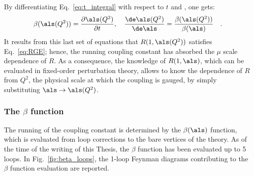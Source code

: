 By differentiating Eq.~\ref{eq:t_integral} with respect to $t$ and \als, one gets:
\begin{equation}\label{eq:beta_def}
    \beta(\als(Q^2)) = \frac{\partial\als(Q^2)}{\partial t}, \quad \frac{\de\als(Q^2)}{\de\als} = \frac{\beta(\als (Q^2))}{\beta(\als)}\quad .
\end{equation}
It results from this last set of equations that $R(1,\als(Q^2))$ satisfies Eq.~\ref{eq:RGE}; hence, the running coupling constant has absorbed the $\mu$ scale dependence of $R$. As a consequence, the knowledge of $R(1,\als)$, which can be evaluated in fixed-order perturbation theory, allows to know the dependence of $R$ from $Q^2$, the physical scale at which the coupling is gauged, by simply substituting $\als \rightarrow \als(Q^2)$. 

\subsubsection{The \ensuremath{\beta} function}
The running of the coupling constant is determined by the $\beta(\als)$ function, which is evaluated from loop corrections to the bare vertices of the theory. As of the time of the writing of this Thesis, the $\beta$ function has been evaluated up to 5 loops\cite{Herzog:2017ohr}. In Fig.~\ref{fig:beta_loops}, the 1-loop Feynman diagrams contributing to the $\beta$ function evaluation are reported.

